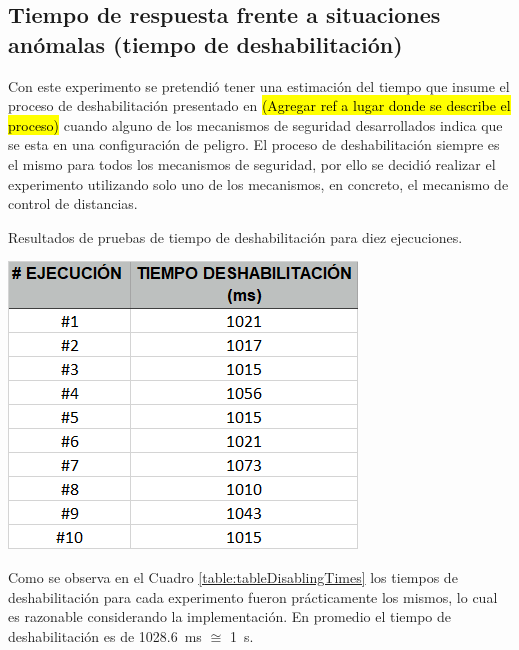\documentclass[withindex,glossary]{cam-thesis}
\begin{document}
\subsection{Tiempo de respuesta frente a situaciones anómalas (tiempo de deshabilitación)}
Con este experimento se pretendió tener una estimación del tiempo que insume el proceso de deshabilitación presentado en \hl{(Agregar ref a lugar donde se describe el proceso)} cuando alguno de los mecanismos de seguridad desarrollados indica que se esta en una configuración de peligro. El proceso de deshabilitación siempre es el mismo para todos los mecanismos de seguridad, por ello se decidió realizar el experimento utilizando solo uno de los mecanismos, en concreto, el mecanismo de control de distancias.

\begin{table}[H]  
  \centering
  \begin{minipage}[b]{0.4\textwidth}  	
  	\caption[Test Tiempo Deshabilitación]{Resultados de pruebas de tiempo de deshabilitación para diez ejecuciones.}
  	\includegraphics[width=\textwidth]{images/Test_DisablingTime}
  	\label{table:tableDisablingTimes}
  \end{minipage}
\end{table}

Como se observa en el Cuadro \ref{table:tableDisablingTimes} los tiempos de deshabilitación para cada experimento fueron prácticamente los mismos, lo cual es razonable considerando la implementación. En promedio el tiempo de deshabilitación es de \SI{1028.6}{\milli\second} $\cong$ \SI{1}{\second}.
\end{document}
